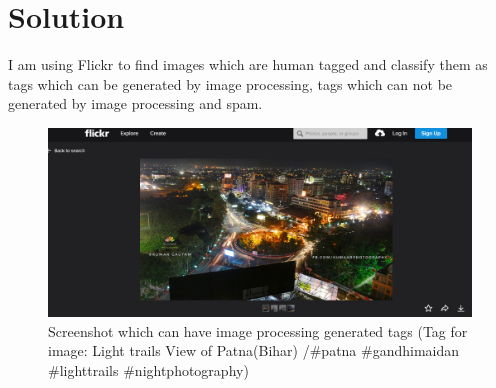 \documentclass[12pt]{report}
\begin{document}
\section{Solution}
I am using Flickr to find images which are human tagged and classify them as tags which can be generated by image processing, tags which can not be generated by image processing and spam.
\begin{figure}[ht]
  \centering
  \includegraphics[width=1\textwidth]{Problem11_11/HumanTag.png}
  \caption{Screenshot which can have image processing generated tags (Tag for image: Light trails View of Patna(Bihar) /\#patna \#gandhimaidan \#lighttrails \#nightphotography)}
  \label{fig:1}
\end{figure}
\end{document}
